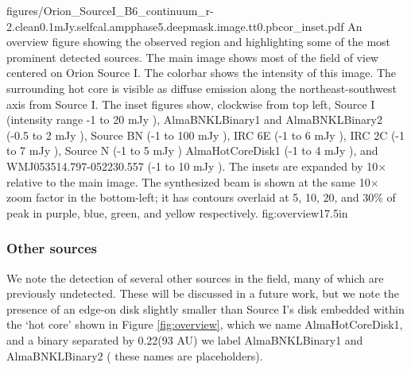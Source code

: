 
\Figure
{figures/Orion_SourceI_B6_continuum_r-2.clean0.1mJy.selfcal.ampphase5.deepmask.image.tt0.pbcor_inset.pdf}
{An overview figure showing the observed region and highlighting some of
the most prominent detected sources.
The main image shows most of the field of view centered on Orion Source I.
The colorbar shows the intensity of this image.
The surrounding hot core is visible as diffuse emission along the northeast-southwest
axis from Source I.
The inset figures show, clockwise from top left, 
Source I (intensity range -1 to 20 mJy \perbeam),
AlmaBNKLBinary1 and AlmaBNKLBinary2 (-0.5 to 2 mJy \perbeam),
Source BN (-1 to 100 mJy \perbeam),
IRC 6E (-1 to 6 mJy \perbeam),
IRC 2C (-1 to 7 mJy \perbeam),
Source N (-1 to 5 mJy \perbeam)
AlmaHotCoreDisk1  (-1 to 4 mJy \perbeam),
and
WMJ053514.797-052230.557 (-1 to 10 mJy \perbeam).
The insets are expanded by 10$\times$ relative to the main image.
The synthesized beam is shown at the same 10$\times$ zoom factor in the
bottom-left; it has contours overlaid at 5, 10, 20, and 30\% of peak
in purple, blue, green, and yellow respectively.
}
{fig:overview}{1}{7.5in}

\subsubsection{Other sources}
We note the detection of several other sources in the field, many of
which are previously undetected.  These will be discussed in a future work,
but we note the presence of an edge-on disk slightly smaller than Source I's
disk embedded within the `hot core' shown in Figure \ref{fig:overview},
which we name AlmaHotCoreDisk1, and a binary separated by 0.22\arcsec (93 AU)
we label AlmaBNKLBinary1 and AlmaBNKLBinary2 ({\color{red} these names are
placeholders}).
